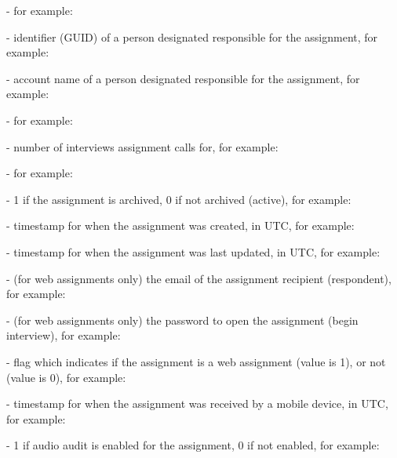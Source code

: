 \begin{compactitem}

   - for example:

   - identifier (GUID) of a person designated
  responsible for the assignment, for example:

   - account name of a person designated
  responsible for the assignment, for example:

   - for example:

   - number of interviews assignment calls
  for, for example:

   - for example:

   - 1 if the assignment is archived, 0 if not
  archived (active), for example:

   - timestamp for when the assignment was
  created, in UTC, for example:

   - timestamp for when the assignment was
  last updated, in UTC, for example:

   - (for web assignments only) the email of the
  assignment recipient (respondent), for example:

   - (for web assignments only) the password to open
  the assignment (begin interview), for example:

   - flag which indicates if the assignment is a web
  assignment (value is 1), or not (value is 0), for example:

   - timestamp for when the
  assignment was received by a mobile device, in UTC, for example:

   - 1 if audio audit is enabled
  for the assignment, 0 if not enabled, for example:

\end{compactitem}


